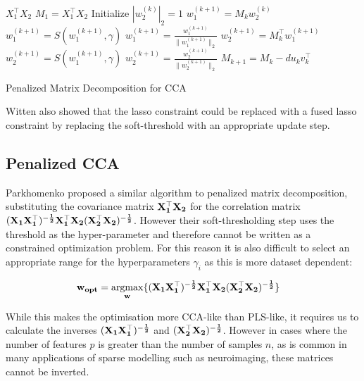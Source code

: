 \vspace{\baselineskip}
\begin{algorithm}[H]
\begin{algorithmic}
 $X_1^{\top}X_2$
\STATE $M_1=X_1^{\top}X_2$
    \STATE Initialize $|w^{(k)}_2|_2=1$
        \STATE $w^{(k+1)}_1=M_kw^{(k)}_2$
        \STATE $w^{(k+1)}_1=S(w^{(k+1)}_1,\gamma)$
        \STATE $w^{(k+1)}_1=\frac{w^{(k+1)}_1}{\|w^{(k+1)}_1\|_2}$
        \STATE $w^{(k+1)}_2=M_k^{\top}w^{(k+1)}_1$
        \STATE $w^{(k+1)}_2=S(w^{(k+1)}_1,\gamma)$
        \STATE $w^{(k+1)}_2=\frac{w^{(k+1)}_2}{\|w^{(k+1)}_2\|_2}$
        \STATE $M_{k+1}=M_k-du_kv_k^{\top}$
    \ENDWHILE
\ENDFOR
\caption[Penalized Matrix Decomposition]{Penalized Matrix Decomposition for CCA}
\end{algorithmic}
\end{algorithm}
\vspace{\baselineskip}

Witten also showed that the lasso constraint could be replaced with a fused lasso constraint by replacing the soft-threshold with an appropriate update step.

\subsection{Penalized CCA}

Parkhomenko proposed a similar algorithm to penalized matrix decomposition, substituting the covariance matrix $\bold{X_1^{\top}X_2}$ for the correlation matrix $\bold{(X_1X_1^{\top})^{-\frac{1}{2}}X_1^{\top}X_2(X_2^{\top}X_2)^{-\frac{1}{2}}}$\cite{parkhomenko2009sparse}. However their soft-thresholding step uses the threshold as the hyper-parameter and therefore cannot be written as a constrained optimization problem. For this reason it is also difficult to select an appropriate range for the hyperparameters $\gamma_i$ as this is more dataset dependent:

\begin{align}
    \label{eq:parkho}
    & \bold{w_{opt}}=\underset{\bold{w}}{\mathrm{argmax}}\{ \bold{(X_1X_1^{\top})^{-\frac{1}{2}}X_1^{\top}X_2(X_2^{\top}X_2)^{-\frac{1}{2}}} \}
\end{align}

While this makes the optimisation more CCA-like than PLS-like, it requires us to calculate the inverses $\bold{(X_1X_1^{\top})^{-\frac{1}{2}}}$ and $\bold{(X_2^{\top}X_2)^{-\frac{1}{2}}}$. However in cases where the number of features $p$ is greater than the number of samples $n$, as is common in many applications of sparse modelling such as neuroimaging, these matrices cannot be inverted. 

